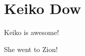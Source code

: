 \documentclass{amsart}
\begin{document}
\section{Keiko Dow}

Keiko is awesome!

She went to Zion!
\end{document}
